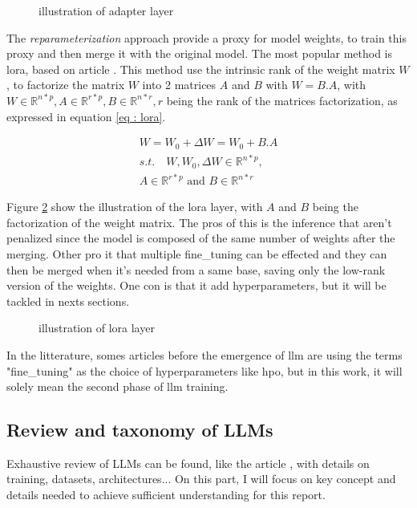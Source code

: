\begin{figure}[h]
    \centering
    
    \caption{illustration of adapter layer}
    \label{fig:adapter}
\end{figure}

The \textit{reparameterization} approach provide a proxy for model weights, to train this proxy and then merge it with the original model. The most popular method is \acrfull{lora}, based on article \cite{hu_lora_2021}. This method use the intrinsic rank of the weight matrix $W$, to factorize the matrix $W$ into 2 matrices $A$ and $B$ with $W = B.A$, with $W \in \mathbb{R}^{n*p}, A \in \mathbb{R}^{r*p} , B \in \mathbb{R}^{n*r}, r$ being the rank of the matrices factorization, as expressed in equation \ref{eq : lora}.

\begin{equation}
    \begin{split}
    W = W_0 + \Delta W = W_0 + B.A \\
    s.t. \quad W,W_0,\Delta W \in \mathbb{R}^{n*p},\\
    A \in \mathbb{R}^{r*p} \text{ and } B \in \mathbb{R}^{n*r}
    \end{split}
    \label{eq : lora}
\end{equation}

Figure \ref{fig:lora} show the illustration of the \gls{lora} layer, with $A$ and $B$ being the factorization of the weight matrix. The pros of this is the inference that aren't penalized since the model is composed of the same number of weights after the merging. Other pro it that multiple \gls{fine_tuning} can be effected and they can then be merged when it's needed from a same base, saving only the low-rank version of the weights. One con is that it add hyperparameters, but it will be tackled in nexts sections.

\begin{figure}[h]
    \centering
    
    \caption{illustration of lora layer}
    \label{fig:lora}
\end{figure}

In the litterature, somes articles before the emergence of \acrshort{llm} are using the terms "\gls{fine_tuning}" as the choice of \glspl{hyperparameter} like \acrfull{hpo}, but in this work, it will solely mean the second phase of \acrshort{llm} training.


\subsection{Review and taxonomy of LLMs}
\label{sec:llm_review}
Exhaustive review of LLMs can be found, like the article \cite{raiaan_review_2024}, with details on training, datasets, architectures... On this part, I will focus on key concept and details needed to achieve sufficient understanding for this report.

